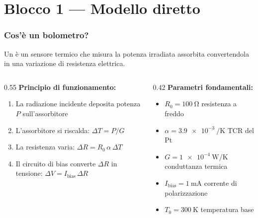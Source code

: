 
\section{Blocco 1 --- Modello diretto}

\begin{frame}
\frametitle{Cos'\`e un bolometro?}

Un  \`e un sensore termico che misura la potenza
irradiata assorbita convertendola in una variazione di resistenza elettrica.

\vspace{0.4em}
\begin{columns}[T]
  \begin{column}{0.55\textwidth}
    \textbf{Principio di funzionamento:}
    \begin{enumerate}
      \item La radiazione incidente deposita potenza $P$ sull'assorbitore
      \item L'assorbitore si riscalda: $\Delta T = P / G$
      \item La resistenza varia: $\Delta R = R_0\,\alpha\,\Delta T$
      \item Il circuito di bias converte $\Delta R$ in tensione: $\Delta V = I_\text{bias}\,\Delta R$
    \end{enumerate}
  \end{column}
  \begin{column}{0.42\textwidth}
    \textbf{Parametri fondamentali:}
    \begin{itemize}
      \item $R_0 = \SI{100}{\ohm}$ \quad resistenza a freddo
      \item $\alpha = \SI{3.9e-3}{\per\kelvin}$ \quad TCR del Pt
      \item $G = \SI{1e-4}{\watt\per\kelvin}$ \quad conduttanza termica
      \item $I_\text{bias} = \SI{1}{\milli\ampere}$ \quad corrente di polarizzazione
      \item $T_0 = \SI{300}{\kelvin}$ \quad temperatura base
    \end{itemize}
  \end{column}
\end{columns}

\end{frame}

